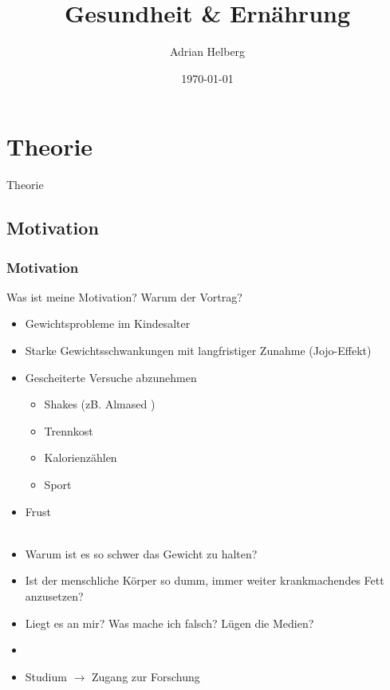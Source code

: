 \documentclass[xcolor=dvipsnames]{beamer}
\title{Gesundheit \& Ernährung}
\author{Adrian Helberg}
\date{\today}
\begin{document}
    \maketitle


    \section{Theorie}
    {
    \begin{frame}
        \begin{center}
            \Huge Theorie
        \end{center}
    \end{frame}
    }

    \subsection{Motivation}
    \begin{frame}[allowframebreaks]
        \frametitle{Motivation}
        \begin{block}{Was ist meine Motivation? Warum der Vortrag?}
            ~
            \begin{itemize}
                \setlength\itemsep{1em}
                \item Gewichtsprobleme im Kindesalter
                \item Starke Gewichtsschwankungen mit langfristiger Zunahme (Jojo-Effekt)
                \item Gescheiterte Versuche abzunehmen
                \begin{itemize}
                    \setlength\itemsep{0.6em}
                    \item Shakes (zB. Almased \textregistered)
                    \item Trennkost
                    \item Kalorienzählen
                    \item Sport
                \end{itemize}
                \item Frust\\~
            \end{itemize}
        \end{block}

        \framebreak

        \begin{itemize}
            \setlength\itemsep{1em}
            \item Warum ist es so schwer das Gewicht zu halten?
            \item Ist der menschliche Körper so dumm, immer weiter krankmachendes Fett anzusetzen?
            \item Liegt es an mir? Was mache ich falsch? Lügen die Medien?
            \item[]
            \item Studium $\rightarrow$ Zugang zur Forschung
        \end{itemize}
    \end{frame}
\end{document}
